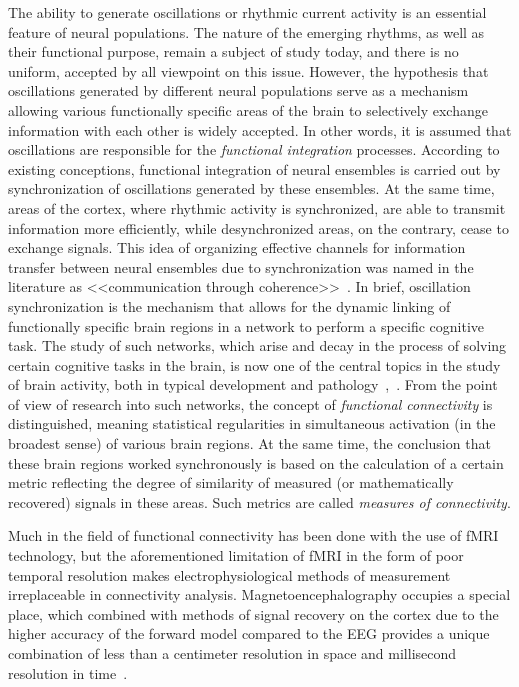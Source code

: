 
The ability to generate oscillations or rhythmic current activity is an
essential feature of neural populations. The nature of the emerging rhythms, as
well as their functional purpose, remain a subject of study today, and there is
no uniform, accepted by all viewpoint on this issue. However, the hypothesis
that oscillations generated by different neural populations serve as a
mechanism allowing various functionally specific areas of the brain to
selectively exchange information with each other is widely accepted. In other
words, it is assumed that oscillations are responsible for the \emph{functional
integration} processes.
According to existing conceptions, functional integration of neural ensembles
is carried out by synchronization of oscillations generated by these ensembles.
At the same time, areas of the cortex, where rhythmic activity is synchronized,
are able to transmit information more efficiently, while desynchronized areas,
on the contrary, cease to exchange signals. This idea of organizing effective
channels for information transfer between neural ensembles due to
synchronization was named in the literature as <<communication through
coherence>>~\cite{Fries2015}. In brief, oscillation synchronization is the
mechanism that allows for the dynamic linking of functionally specific brain
regions in a network to perform a specific cognitive task. The study of such
networks, which arise and decay in the process of solving certain cognitive
tasks in the brain, is now one of the central topics in the study of brain
activity, both in typical development and pathology~\cite{varela, baker,
ossadtchi, Bastin2017},~\cite{Alamian_front2017, Alamian_clin2017}.  From the
point of view of research into such networks, the concept of \emph{functional
connectivity} is distinguished, meaning statistical regularities in
simultaneous activation (in the broadest sense) of various brain regions.
At the same time, the conclusion that these brain regions worked synchronously
is based on the calculation of a certain metric reflecting the degree of
similarity of measured (or mathematically recovered) signals in these areas.
Such metrics are called \emph{measures of connectivity}.

Much in the field of functional connectivity has been done with the use of fMRI
technology, but the aforementioned limitation of fMRI in the form of poor
temporal resolution makes electrophysiological methods of measurement
irreplaceable in connectivity analysis. Magnetoencephalography occupies a
special place, which combined with methods of signal recovery on the cortex due
to the higher accuracy of the forward model compared to the EEG provides  a
unique combination of less than a centimeter resolution in space and
millisecond resolution in time~\cite{hamalainen, Baillet, Gross2013}.


